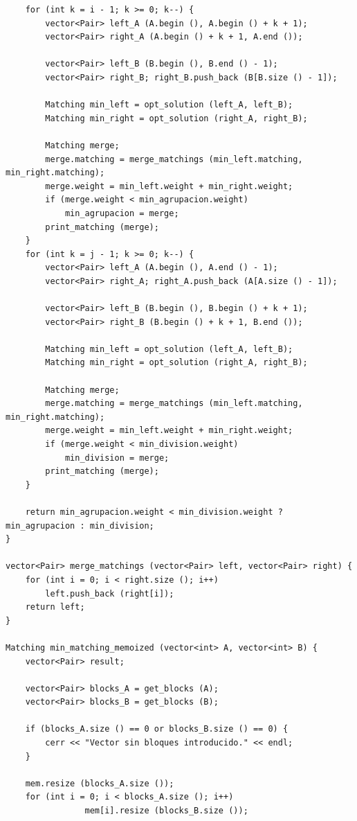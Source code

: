 \documentclass{article}
\begin{document}
\begin{lstlisting}
    for (int k = i - 1; k >= 0; k--) {
        vector<Pair> left_A (A.begin (), A.begin () + k + 1);
        vector<Pair> right_A (A.begin () + k + 1, A.end ());

        vector<Pair> left_B (B.begin (), B.end () - 1);
        vector<Pair> right_B; right_B.push_back (B[B.size () - 1]);

        Matching min_left = opt_solution (left_A, left_B);
        Matching min_right = opt_solution (right_A, right_B);

        Matching merge;
        merge.matching = merge_matchings (min_left.matching, min_right.matching);
        merge.weight = min_left.weight + min_right.weight;
        if (merge.weight < min_agrupacion.weight)
            min_agrupacion = merge;
        print_matching (merge);
    }
    for (int k = j - 1; k >= 0; k--) {
        vector<Pair> left_A (A.begin (), A.end () - 1);
        vector<Pair> right_A; right_A.push_back (A[A.size () - 1]);

        vector<Pair> left_B (B.begin (), B.begin () + k + 1);
        vector<Pair> right_B (B.begin () + k + 1, B.end ());

        Matching min_left = opt_solution (left_A, left_B);
        Matching min_right = opt_solution (right_A, right_B);

        Matching merge;
        merge.matching = merge_matchings (min_left.matching, min_right.matching);
        merge.weight = min_left.weight + min_right.weight;
        if (merge.weight < min_division.weight)
            min_division = merge;
        print_matching (merge);
    }

    return min_agrupacion.weight < min_division.weight ? min_agrupacion : min_division;
}

vector<Pair> merge_matchings (vector<Pair> left, vector<Pair> right) {
    for (int i = 0; i < right.size (); i++)
        left.push_back (right[i]);
    return left;
}

Matching min_matching_memoized (vector<int> A, vector<int> B) {
    vector<Pair> result;

    vector<Pair> blocks_A = get_blocks (A);
    vector<Pair> blocks_B = get_blocks (B);

    if (blocks_A.size () == 0 or blocks_B.size () == 0) {
        cerr << "Vector sin bloques introducido." << endl;
    }

    mem.resize (blocks_A.size ());
    for (int i = 0; i < blocks_A.size (); i++)
                mem[i].resize (blocks_B.size ());


\end{lstlisting}
\end{document}
